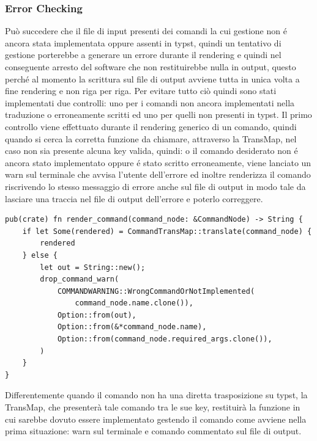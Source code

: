 \documentclass{article}
\begin{document}
    \subsubsection{Error Checking}
    Può succedere che il file di input presenti dei comandi la cui gestione non é ancora stata implementata oppure assenti in typst, quindi un tentativo di gestione porterebbe a generare un errore durante il rendering e quindi nel conseguente arresto del software che non restituirebbe nulla in output, questo perché al momento la scrittura sul file di output avviene tutta in unica volta a fine rendering e non riga per riga.
    Per evitare tutto ciò quindi sono stati implementati due controlli: uno per i comandi non ancora implementati nella traduzione o erroneamente scritti ed uno per quelli non presenti in typst.
    Il primo controllo viene effettuato durante il rendering generico di un comando, quindi quando si cerca la corretta funzione da chiamare, attraverso la TransMap, nel caso non sia presente alcuna key valida, quindi: o il comando desiderato non é ancora stato implementato oppure é stato scritto erroneamente, viene lanciato un warn sul terminale che avvisa l'utente dell'errore ed inoltre renderizza il comando riscrivendo lo stesso messaggio di errore anche sul file di output in modo tale da lasciare una traccia nel file di output dell'errore e poterlo correggere.
    \begin{verbatim}
pub(crate) fn render_command(command_node: &CommandNode) -> String {
    if let Some(rendered) = CommandTransMap::translate(command_node) {
        rendered
    } else {
        let out = String::new();
        drop_command_warn(
            COMMANDWARNING::WrongCommandOrNotImplemented(
                command_node.name.clone()),
            Option::from(out),
            Option::from(&*command_node.name),
            Option::from(command_node.required_args.clone()),
        )
    }
}
    \end{verbatim}
    Differentemente quando il comando non ha una diretta trasposizione su typst, la TransMap, che presenterà tale comando tra le sue key, restituirà la funzione in cui sarebbe dovuto essere implementato gestendo il comando come avviene nella prima situazione: warn sul terminale e comando commentato sul file di output.
\end{document}
